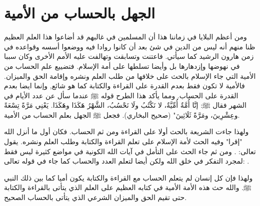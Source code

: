 \section{الجهل بالحساب من الأمية}

ومن أعظم البلايا في زماننا هذا أن المسلمين في غالبهم قد أضاعوا هذا العلم العظيم ظنا منهم أنه ليس من الدين في شئ بعد أن كانوا روادا فيه ووضعوا أسسه وقواعده في زمن هارون الرشيد كما سيأتي. فاعتنت وتسابقت وتهالفت عليه الأمم الأخرى وكان سببا في نهوضها وإزدهارها بل وأيضا تسلطها على أمة الإسلام. فتضييع علم الحساب من الأمية التي جاء الإسلام بالحث على خلافها من طلب العلم ونشره وإقامة الحق والميزان. فالأمية لا تكون فقط بعدم القدرة على القراءة والكتابة كما هو شائع, وإنما ايضا بعدم القدرة على الحساب.
ومما يأكد هذا الطرح قوله ﷺ عندما سأل عن عدد الأيام في الشهر فقال ﷺ:
إنَّا أُمَّةٌ أُمِّيَّةٌ، لا نَكْتُبُ ولَا نَحْسُبُ، الشَّهْرُ هَكَذَا وهَكَذَا. يَعْنِي مَرَّةً تِسْعَةً وعِشْرِينَ، ومَرَّةً ثَلَاثِينَ"
{\footnotesize (صحيح البخاري)}.
فجعل ﷺ الجهل بعلم الحساب من الأمية.

ولهذا جاءت الشريعة بالحث أولا على القراءة ومن ثم الحساب. فكان أول ما أنزل الله "إقرا" وفيه الحث لأمة الإسلام على تعلم القراءة والكتابة وطلب العلم ونشره.
يقول تعالى:
\quranayah*[96][1-5]{\footnotesize \surahname*[96]}.
ومن ثم جاء الحث على التأمل في آيات الله الكونية في مواضع كثيرة ليس فقط لمجرد التفكر في خلق الله ولكن أيضا لتعلم العدد والحساب كما جاء في قوله تعالى:
\quranayah*[10][5]{\footnotesize \surahname*[10]}.


ولهذا فإن كل إنسان لم يتعلم الحساب مع القراءة والكتابة يكون أميا كما بين ذلك النبي ﷺ. والله حث هذه الأمة الأمية في كتابه العظيم على العلم الذي يتأتى بالقراءة والكتابة حتى تقيم الحق والميزان الشرعي الذي يتأتى بالحساب الصحيح.

